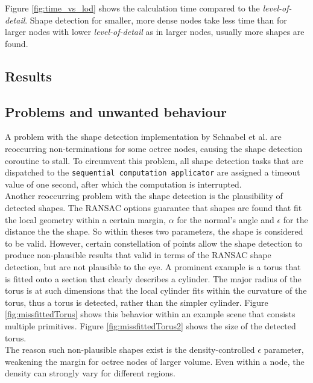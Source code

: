 Figure \ref{fig:time_vs_lod} shows the calculation time compared to the \textit{level-of-detail}. Shape detection for smaller, more dense nodes take less time than for larger nodes with lower \textit{level-of-detail} as in larger nodes, usually more shapes are found. 
\subsection{Results}


\subsection{Problems and unwanted behaviour}

A problem with the shape detection implementation by Schnabel et al.\cite{schnabel-2007-software} are reoccurring non-terminations for some octree nodes, causing the shape detection coroutine to stall. To circumvent this problem, all shape detection tasks that are dispatched to the \verb|sequential computation applicator| are assigned a timeout value of one second, after which the computation is interrupted. 
\\
Another reoccurring problem with the shape detection is the plausibility of detected shapes. The RANSAC options guarantee that shapes are found that fit the local geometry within a certain margin, $\alpha$ for the normal's angle and $\epsilon$ for the distance the the shape. So within theses two parameters, the shape is considered to be valid. However, certain constellation of points allow the shape detection to produce non-plausible results that valid in terms of the RANSAC shape detection, but are not plausible to the eye. A prominent example is a torus that is fitted onto a section that clearly describes a cylinder. The major radius of the torus is at such dimensions that the local cylinder fits within the curvature of the torus, thus a torus is detected, rather than the simpler cylinder. Figure \ref{fig:missfittedTorus} shows this behavior within an example scene that consists multiple primitives. Figure \ref{fig:missfittedTorus2} shows the size of the detected torus. 
\\
The reason such non-plausible shapes exist is the density-controlled $\epsilon$ parameter, weakening the margin for octree nodes of larger volume. Even within a node, the density can strongly vary for different regions. 

